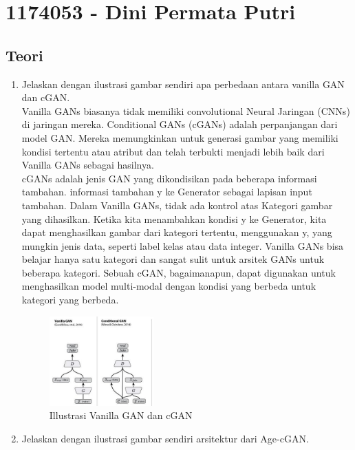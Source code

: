 \section{1174053 - Dini Permata Putri}

\subsection{Teori}
\begin{enumerate}
	\item Jelaskan dengan ilustrasi gambar sendiri apa perbedaan antara vanilla GAN dan cGAN.\\
	Vanilla GANs biasanya tidak memiliki convolutional Neural Jaringan (CNNs) di jaringan mereka.
Conditional GANs (cGANs) adalah perpanjangan dari model GAN. Mereka memungkinkan untuk generasi gambar yang memiliki kondisi tertentu atau atribut dan telah terbukti menjadi lebih baik dari Vanilla GANs sebagai hasilnya. \\
cGANs adalah jenis GAN yang dikondisikan pada beberapa informasi tambahan.  informasi tambahan y ke Generator sebagai lapisan input tambahan. Dalam Vanilla GANs, tidak ada kontrol atas Kategori gambar yang dihasilkan. Ketika kita menambahkan kondisi y ke Generator, kita dapat menghasilkan gambar dari kategori tertentu, menggunakan y, yang mungkin jenis data, seperti label kelas atau data integer. Vanilla GANs bisa belajar hanya satu kategori dan sangat sulit untuk arsitek GANs untuk beberapa kategori. Sebuah cGAN, bagaimanapun, dapat digunakan untuk menghasilkan model multi-modal dengan kondisi yang berbeda untuk kategori yang berbeda.

	\hfill \break
	\begin{figure}[H]
		\includegraphics[width=4cm]{figures/1174053/9/1.jpg}
		\centering
		\caption{Illustrasi Vanilla GAN dan cGAN}
	\end{figure}
	\item Jelaskan dengan ilustrasi gambar sendiri arsitektur dari Age-cGAN.
	\hfill \break
	

\end{enumerate}
